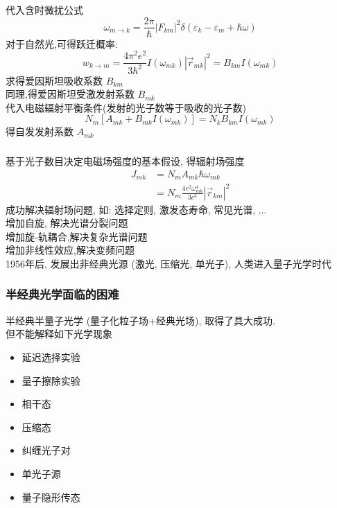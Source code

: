 \begin{frame}
      \frametitle{}
      代入含时微扰公式
      \[ \omega_{m \rightarrow k}=\frac{2 \pi}{\hbar}\left|F_{k m}\right|^{2} \delta\left(\varepsilon_{k}-\varepsilon_{m}+\hbar \omega\right) \]
      对于自然光,可得跃迁概率:
      \[ w_{k \rightarrow m}=\frac{4 \pi^{2} e^{2}}{3 \hbar^{2}} I\left(\omega_{m k}\right)\left|\vec{r}_{m k}\right|^{2} = B_{km} I\left(\omega_{m k}\right)\]
      求得爱因斯坦吸收系数 $B_{km}$ \\ 
      同理,得爱因斯坦受激发射系数 $B_{mk}$  \\ 
      代入电磁辐射平衡条件(发射的光子数等于吸收的光子数) 
      \[N_{m}\left[A_{m k}+B_{m k} I\left(\omega_{m k}\right)\right]=N_{k} B_{k m} I\left(\omega_{m k}\right) \]
      得自发发射系数 $A_{mk}$ 
\end{frame}

\begin{frame}
      \frametitle{}
      基于光子数目决定电磁场强度的基本假设, 得辐射场强度
    \[\begin{aligned}
        J_{m k} &=N_{m} A_{m k} \hbar \omega_{m k} \\
        &=N_{m} \frac{4 e^{2} \omega_{m k}^{4}}{3 c^{3}}\left|\vec{r}_{k m}\right|^{2} 
        \end{aligned} \] {\vspace*{2.3em}}
    成功解决辐射场问题, 如: 选择定则, 激发态寿命, 常见光谱, ... \\ \vspace*{2.0em}
    增加自旋, 解决光谱分裂问题 \\
    增加旋-轨耦合,解决复杂光谱问题 \\ 
    增加非线性效应,解决变频问题 \\
    1956年后, 发展出非经典光源 (激光, 压缩光, 单光子), 
    人类进入量子光学时代
\end{frame}

\begin{frame}
    \frametitle{半经典光学面临的困难}
    半经典半量子光学 (量子化粒子场+经典光场), 取得了具大成功. \\ 
    但不能解释如下光学现象
    \begin{itemize}
        \item 延迟选择实验
        \item 量子擦除实验
        \item 相干态
        \item 压缩态
        \item 纠缠光子对
        \item 单光子源
        \item 量子隐形传态
    \end{itemize}
\end{frame}

